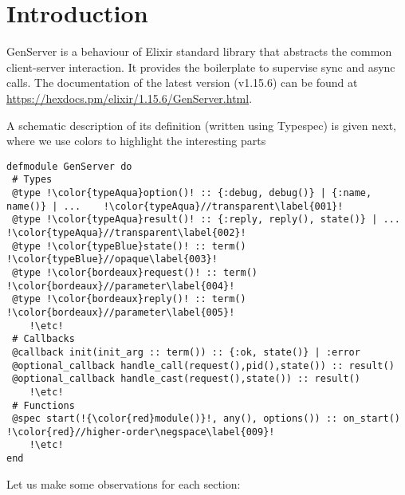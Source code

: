 \documentclass[a4paper,10pt]{article}
\author{Aghilas Y. Boussaa and Giuseppe Castagna}
\begin{document}
\section{Introduction}


GenServer is a behaviour of Elixir standard library that abstracts the
common client-server interaction. It provides the boilerplate to
supervise sync and async calls. The documentation of the latest
version (v1.15.6) can be found at \url{https://hexdocs.pm/elixir/1.15.6/GenServer.html}.

A schematic description of its definition (written using Typespec)
is given next, where we use colors to highlight the
interesting parts
\begin{verbatim}
defmodule GenServer do
 # Types  
 @type !\color{typeAqua}option()! :: {:debug, debug()} | {:name, name()} | ...    !\color{typeAqua}//transparent\label{001}!
 @type !\color{typeAqua}result()! :: {:reply, reply(), state()} | ...             !\color{typeAqua}//transparent\label{002}!
 @type !\color{typeBlue}state()! :: term()                                        !\color{typeBlue}//opaque\label{003}!
 @type !\color{bordeaux}request()! :: term()                                      !\color{bordeaux}//parameter\label{004}!
 @type !\color{bordeaux}reply()! :: term()                                        !\color{bordeaux}//parameter\label{005}!
    !\etc!
 # Callbacks
 @callback init(init_arg :: term()) :: {:ok, state()} | :error 
 @optional_callback handle_call(request(),pid(),state()) :: result() 
 @optional_callback handle_cast(request(),state()) :: result()       
    !\etc!
 # Functions
 @spec start(!{\color{red}module()}!, any(), options()) :: on_start()          !\color{red}//higher-order\negspace\label{009}!
    !\etc!
end
\end{verbatim}
Let us make some observations for each section:
\end{document}
